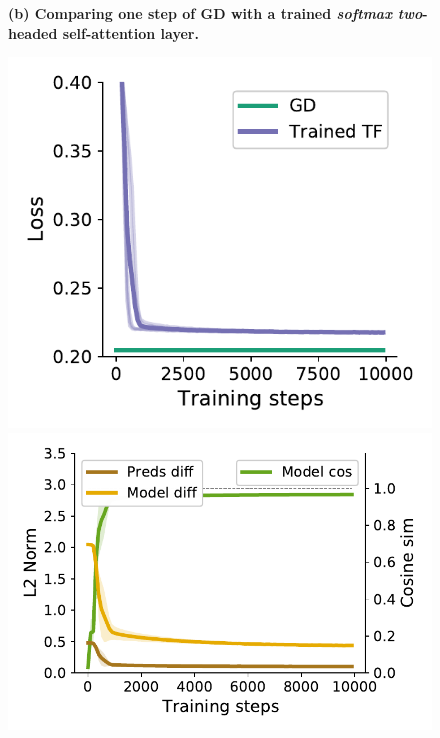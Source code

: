 \documentclass{article}
\theoremstyle{plain}
\theoremstyle{definition}
\theoremstyle{remark}
\begin{document}
\begin{figure}
\begin{center}
\begin{minipage}{.23\textwidth}
\begin{center}
  \end{center}
  \vspace{-10pt}
\end{minipage}
\end{center}
\textbf{(b) Comparing one step of GD with a trained \textit{softmax two}-headed self-attention layer.}
\begin{center}
\begin{minipage}{.22\textwidth}
  \centering
  \begin{center}
    \includegraphics[width=1.\textwidth]{Final_figures/softmax/train_22.pdf}
  \end{center}
  \vspace{-10pt}
\end{minipage}
\begin{minipage}{.28\textwidth}
  \centering
  \begin{center}
    \includegraphics[width=1.\textwidth]{Final_figures/softmax/sim_6.pdf}

\end{center}
\end{minipage}
\end{center}
\end{figure}
\end{document}

